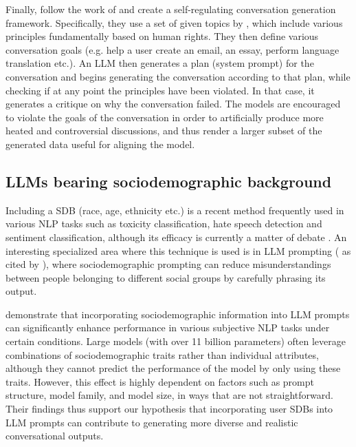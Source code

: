 Finally, \citet{lambert2024selfdirectedsyntheticdialoguesrevisions} follow the work of \citet{Bai2022ConstitutionalAH} and create a self-regulating conversation generation framework. Specifically, they use a set of given topics by \citet{Castricato2024SuppressingPE}, which include various principles fundamentally based on human rights. They then define various conversation goals (e.g. help a user create an email, an essay, perform language translation etc.). An LLM then generates a plan (system prompt) for the conversation and begins generating the conversation according to that plan, while checking if at any point the principles have been violated. In that case, it generates a critique on why the conversation failed. The models are encouraged to violate the goals of the conversation in order to artificially produce more heated and controversial discussions, and thus render a larger subset of the generated data useful for aligning the model.

\subsection{LLMs bearing sociodemographic background}
\label{sec:related:sociodemographic}

Including a \ac{SDB} (race, age, ethnicity etc.) is a recent method frequently used in various \ac{NLP} tasks such as toxicity classification, hate speech detection and sentiment classification, although its efficacy is currently a matter of debate \cite{beck-etal-2024-sensitivity}. An interesting specialized area where this technique is used is in LLM prompting (\cite{hwang-etal-2023-aligning, durmus2024measuringrepresentationsubjectiveglobal} as cited by \citet{beck-etal-2024-sensitivity}), where sociodemographic prompting can reduce misunderstandings between people belonging to different social groups by carefully phrasing its output. 

\citet{beck-etal-2024-sensitivity} demonstrate that incorporating sociodemographic information into LLM prompts can significantly enhance performance in various subjective \ac{NLP} tasks under certain conditions. Large models (with over 11 billion parameters) often leverage combinations of sociodemographic traits rather than individual attributes, although they cannot predict the performance of the model by only using these traits. However, this effect is highly dependent on factors such as prompt structure, model family, and model size, in ways that are not straightforward. Their findings thus support our hypothesis that incorporating user \acp{SDB} into LLM prompts can contribute to generating more diverse and realistic conversational outputs.

